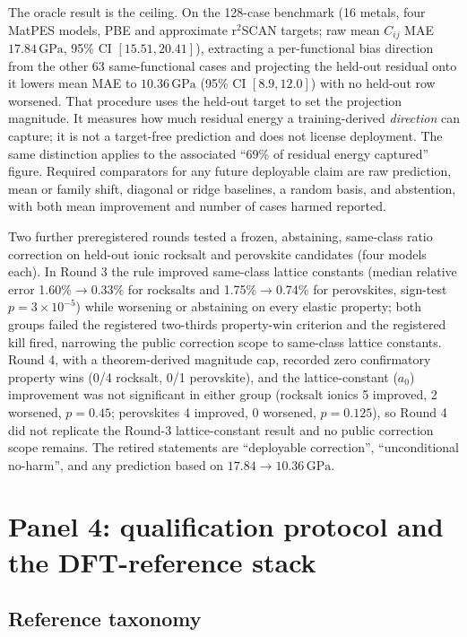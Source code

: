 \documentclass[11pt]{article}
\newcommand{\GPa}{\,\mathrm{GPa}}
\begin{document}
The oracle result is the ceiling. On the 128-case benchmark (16 metals, four MatPES models, PBE and approximate r$^2$SCAN targets; raw mean $C_{ij}$ MAE $17.84\GPa$, 95\% CI $[15.51,20.41]$), extracting a per-functional bias direction from the other 63 same-functional cases and projecting the held-out residual onto it lowers mean MAE to $10.36\GPa$ (95\% CI $[8.9,12.0]$) with no held-out row worsened. That procedure uses the held-out target to set the projection magnitude. It measures how much residual energy a training-derived \emph{direction} can capture; it is not a target-free prediction and does not license deployment. The same distinction applies to the associated ``69\% of residual energy captured'' figure. Required comparators for any future deployable claim are raw prediction, mean or family shift, diagonal or ridge baselines, a random basis, and abstention, with both mean improvement and number of cases harmed reported.

Two further preregistered rounds tested a frozen, abstaining, same-class ratio correction on held-out ionic rocksalt and perovskite candidates (four models each). In Round 3 the rule improved same-class lattice constants (median relative error 1.60\%$\to$0.33\% for rocksalts and 1.75\%$\to$0.74\% for perovskites, sign-test $p=3\times10^{-5}$) while worsening or abstaining on every elastic property; both groups failed the registered two-thirds property-win criterion and the registered kill fired, narrowing the public correction scope to same-class lattice constants. Round 4, with a theorem-derived magnitude cap, recorded zero confirmatory property wins (0/4 rocksalt, 0/1 perovskite), and the lattice-constant ($a_0$) improvement was not significant in either group (rocksalt ionics 5 improved, 2 worsened, $p=0.45$; perovskites 4 improved, 0 worsened, $p=0.125$), so Round 4 did not replicate the Round-3 lattice-constant result and no public correction scope remains. The retired statements are ``deployable correction'', ``unconditional no-harm'', and any prediction based on $17.84\to10.36\GPa$.

\section{Panel 4: qualification protocol and the DFT-reference stack}
\label{sec:qualification}

\subsection{Reference taxonomy}
\end{document}
